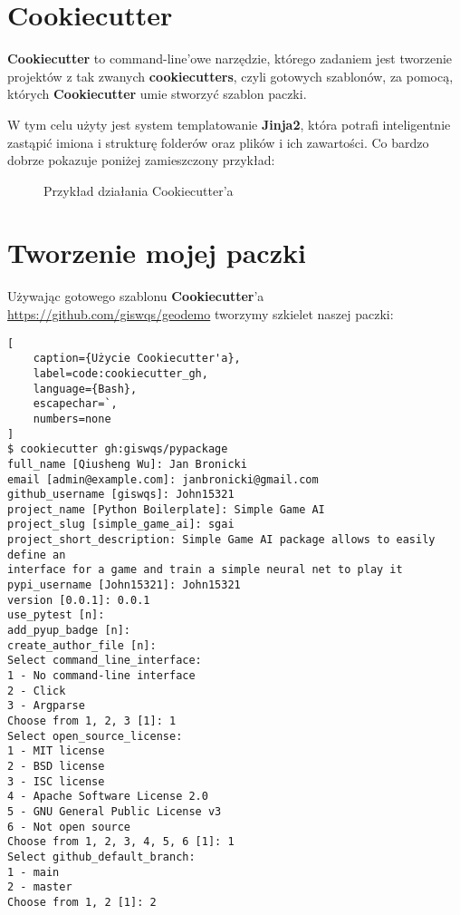 \section{Cookiecutter}
\textbf{Cookiecutter} to command-line'owe narzędzie, którego zadaniem jest tworzenie projektów z tak zwanych \textbf{cookiecutters}, czyli gotowych szablonów, za pomocą, których \textbf{Cookiecutter} umie stworzyć szablon paczki.

W tym celu użyty jest system templatowanie \textbf{Jinja2}, która potrafi inteligentnie zastąpić imiona i strukturę folderów oraz plików i ich zawartości. Co bardzo dobrze pokazuje poniżej zamieszczony przykład:

\begin{figure}[h]
    \centering
    \caption{Przykład działania Cookiecutter'a \cite{CookiecutterExample}}
    \label{img:cookiecutter_example}
\end{figure}


\clearpage
\section{Tworzenie mojej paczki}

Używając gotowego szablonu \textbf{Cookiecutter}'a 
\url{https://github.com/giswqs/geodemo} tworzymy szkielet naszej paczki:

\begin{onepage}
    \begin{lstlisting}[
    caption={Użycie Cookiecutter'a},
    label=code:cookiecutter_gh,
    language={Bash},
    escapechar=`,
    numbers=none
]
$ cookiecutter gh:giswqs/pypackage
full_name [Qiusheng Wu]: Jan Bronicki
email [admin@example.com]: janbronicki@gmail.com
github_username [giswqs]: John15321
project_name [Python Boilerplate]: Simple Game AI
project_slug [simple_game_ai]: sgai
project_short_description: Simple Game AI package allows to easily define an
interface for a game and train a simple neural net to play it
pypi_username [John15321]: John15321
version [0.0.1]: 0.0.1
use_pytest [n]:
add_pyup_badge [n]:
create_author_file [n]:
Select command_line_interface:
1 - No command-line interface
2 - Click
3 - Argparse
Choose from 1, 2, 3 [1]: 1
Select open_source_license:
1 - MIT license
2 - BSD license
3 - ISC license
4 - Apache Software License 2.0
5 - GNU General Public License v3
6 - Not open source
Choose from 1, 2, 3, 4, 5, 6 [1]: 1
Select github_default_branch:
1 - main
2 - master
Choose from 1, 2 [1]: 2
\end{lstlisting}
\end{onepage}

